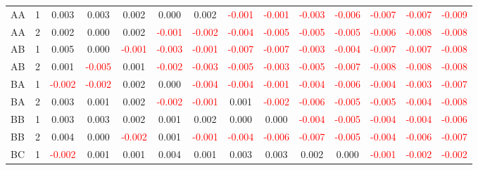 \begin{table}[H]
{\begin{tabular}{llcccccccccccc}
AA & 1 & 0.003 & 0.003 & 0.002 & 0.000 & 0.002 & \textcolor{red}{-0.001} & \textcolor{red}{-0.001} & \textcolor{red}{-0.003} & \textcolor{red}{-0.006} & \textcolor{red}{-0.007} & \textcolor{red}{-0.007} & \textcolor{red}{-0.009}\\
AA & 2 & 0.002 & 0.000 & 0.002 & \textcolor{red}{-0.001} & \textcolor{red}{-0.002} & \textcolor{red}{-0.004} & \textcolor{red}{-0.005} & \textcolor{red}{-0.005} & \textcolor{red}{-0.005} & \textcolor{red}{-0.006} & \textcolor{red}{-0.008} & \textcolor{red}{-0.008}\\
AB & 1 & 0.005 & 0.000 & \textcolor{red}{-0.001} & \textcolor{red}{-0.003} & \textcolor{red}{-0.001} & \textcolor{red}{-0.007} & \textcolor{red}{-0.007} & \textcolor{red}{-0.003} & \textcolor{red}{-0.004} & \textcolor{red}{-0.007} & \textcolor{red}{-0.007} & \textcolor{red}{-0.008}\\
AB & 2 & 0.001 & \textcolor{red}{-0.005} & 0.001 & \textcolor{red}{-0.002} & \textcolor{red}{-0.003} & \textcolor{red}{-0.005} & \textcolor{red}{-0.003} & \textcolor{red}{-0.005} & \textcolor{red}{-0.007} & \textcolor{red}{-0.008} & \textcolor{red}{-0.008} & \textcolor{red}{-0.008}\\
BA & 1 & \textcolor{red}{-0.002} & \textcolor{red}{-0.002} & 0.002 & 0.000 & \textcolor{red}{-0.004} & \textcolor{red}{-0.004} & \textcolor{red}{-0.001} & \textcolor{red}{-0.004} & \textcolor{red}{-0.006} & \textcolor{red}{-0.004} & \textcolor{red}{-0.003} & \textcolor{red}{-0.007}\\
BA & 2 & 0.003 & 0.001 & 0.002 & \textcolor{red}{-0.002} & \textcolor{red}{-0.001} & 0.001 & \textcolor{red}{-0.002} & \textcolor{red}{-0.006} & \textcolor{red}{-0.005} & \textcolor{red}{-0.005} & \textcolor{red}{-0.004} & \textcolor{red}{-0.008}\\
BB & 1 & 0.003 & 0.003 & 0.002 & 0.001 & 0.002 & 0.000 & 0.000 & \textcolor{red}{-0.004} & \textcolor{red}{-0.005} & \textcolor{red}{-0.004} & \textcolor{red}{-0.004} & \textcolor{red}{-0.006}\\
BB & 2 & 0.004 & 0.000 & \textcolor{red}{-0.002} & 0.001 & \textcolor{red}{-0.001} & \textcolor{red}{-0.004} & \textcolor{red}{-0.006} & \textcolor{red}{-0.007} & \textcolor{red}{-0.005} & \textcolor{red}{-0.004} & \textcolor{red}{-0.006} & \textcolor{red}{-0.007}\\
BC & 1 & \textcolor{red}{-0.002} & 0.001 & 0.001 & 0.004 & 0.001 & 0.003 & 0.003 & 0.002 & 0.000 & \textcolor{red}{-0.001} & \textcolor{red}{-0.002} & \textcolor{red}{-0.002}\\

\end{tabular}}
\end{table}

